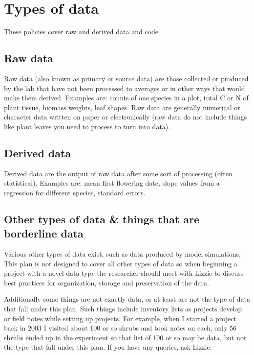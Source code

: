 \documentclass[11pt,a4paper,oneside]{article}
\begin{document}
\section{Types of data}
These policies cover raw and derived data and code. 

\subsection{Raw data} Raw data (also known as primary or source data) are those collected or produced by the lab that have not been processed to averages or in other ways that would make them derived. Examples are: counts of one species in a plot, total C or N of plant tissue, biomass weights, leaf shapes. Raw data are generally numerical or character data written on paper or electronically (raw data do not include things like plant leaves you need to process to turn into data).

\subsection{Derived data} Derived data are the output of raw data after some sort of processing (often statistical). Examples are: mean first flowering date, slope values from a regression for different species, standard errors.

\subsection{Other types of data \& things that are borderline data} Various other types of data exist, such as data produced by model simulations. This plan is not designed to cover all other types of data so when beginning a project with a novel data type the researcher should meet with Lizzie to discuss best practices for organization, storage and preservation of the data. 

Additionally some things are not exactly data, or at least are not the type of data that fall under this plan. Such things include inventory lists as projects develop or field notes while setting up projects. For example, when I started a project back in 2003 I visited about 100 or so shrubs and took notes on each, only 56 shrubs ended up in the experiment so that list of 100 or so may be data, but not the type that fall under this plan. If you have any queries, ask Lizzie. 
\end{document}
